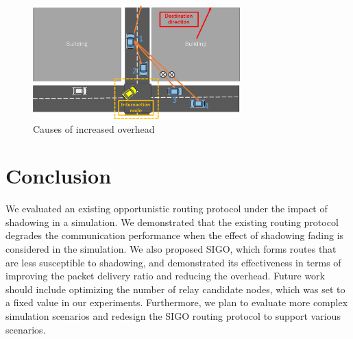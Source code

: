 \documentclass[conference]{IEEEtran}
\begin{document}
\begin{figure}[!ht]
\centering
\includegraphics[width=80mm]{figures/overhead_reason.eps}
\caption{Causes of increased overhead}
\label{fig:overhead_reason}
\end{figure}



\section{Conclusion}
\label{conclusion}
We evaluated an existing opportunistic routing protocol under the impact of shadowing in a simulation. We demonstrated that the existing routing protocol degrades the communication performance when the effect of shadowing fading is considered in the simulation. 
We also proposed SIGO, which forms routes that are less susceptible to shadowing, and demonstrated its effectiveness in terms of improving the packet delivery ratio and reducing the overhead. 
Future work should include optimizing the number of relay candidate nodes, which was set to a fixed value in  our experiments. Furthermore, we plan to evaluate more complex simulation scenarios and redesign the SIGO routing protocol to support  various scenarios.





\end{document}
